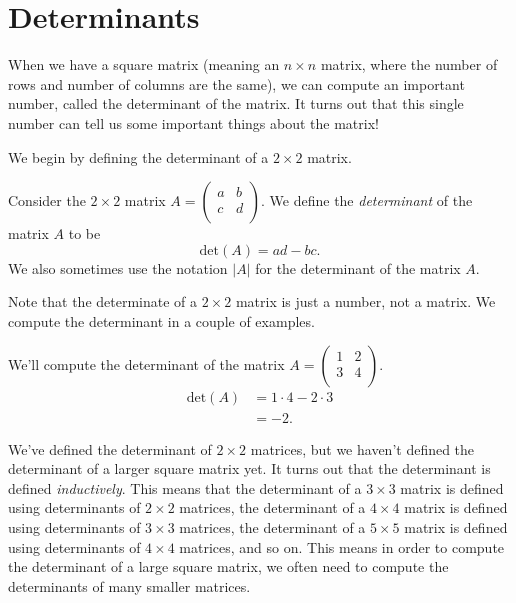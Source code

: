 \documentclass{ximera}
\begin{document}
\section{Determinants}

When we have a square matrix (meaning an $n\times n$ matrix, where the number of rows and number of columns are the same), we can compute an important number, called the determinant of the matrix. It turns out that this single number can tell us some important things about the matrix!

We begin by defining the determinant of a $2\times 2$ matrix.

\begin{definition}
Consider the $2\times 2$ matrix $A=\left(\begin{array}{cc}a & b \\ c & d\\\end{array}\right)$. We define the \emph{determinant} of the matrix $A$ to be
\[
\textrm{det}(A) = ad-bc.
\]
We also sometimes use the notation $|A|$ for the determinant of the matrix $A$.
\end{definition}

Note that the determinate of a $2\times 2$ matrix is just a number, not a matrix. We compute the determinant in a couple of examples.

\begin{example}
We'll compute the determinant of the matrix $A = \left(\begin{array}{cc}1 & 2 \\ 3 & 4\\\end{array}\right)$.
\begin{align*}
\textrm{det}(A) &= 1\cdot 4 - 2\cdot 3\\
&= -2.
\end{align*}
\end{example}

We've defined the determinant of $2\times 2$ matrices, but we haven't defined the determinant of a larger square matrix yet. It turns out that the determinant is defined \emph{inductively}. This means that the determinant of a $3\times 3$ matrix is defined using determinants of $2\times 2$ matrices, the determinant of a $4\times 4$ matrix is defined using determinants of $3\times 3$ matrices, the determinant of a $5\times 5$ matrix is defined using determinants of $4\times 4$ matrices, and so on. This means in order to compute the determinant of a large square matrix, we often need to compute the determinants of many smaller matrices.
\end{document}
